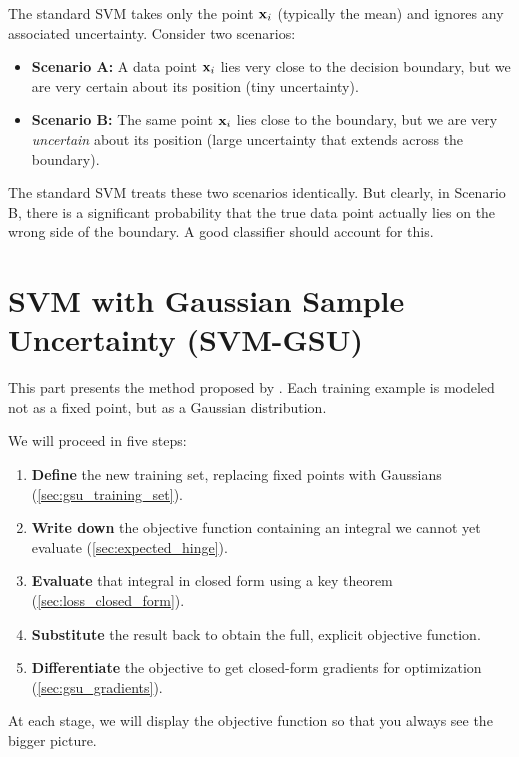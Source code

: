 \documentclass[11pt, letterpaper]{article}
\begin{document}
The standard SVM takes only the point $\vb{x}_i$ (typically the mean) and ignores any associated uncertainty. Consider two scenarios:
\begin{itemize}[leftmargin=2em]
    \item \textbf{Scenario A:} A data point $\vb{x}_i$ lies very close to the decision boundary, but we are very certain about its position (tiny uncertainty).
    \item \textbf{Scenario B:} The same point $\vb{x}_i$ lies close to the boundary, but we are very \emph{uncertain} about its position (large uncertainty that extends across the boundary).
\end{itemize}
The standard SVM treats these two scenarios identically. But clearly, in Scenario B, there is a significant probability that the true data point actually lies on the wrong side of the boundary. A good classifier should account for this.


\part{SVM with Gaussian Sample Uncertainty (SVM-GSU)}

This part presents the method proposed by \textcite{tzelepis2017linear}. Each training example is modeled not as a fixed point, but as a Gaussian distribution.

\medskip
\begin{statusbox}
We will proceed in five steps:
\begin{enumerate}[leftmargin=1.5em, topsep=2pt, itemsep=1pt]
    \item \textbf{Define} the new training set, replacing fixed points with Gaussians (\cref{sec:gsu_training_set}).
    \item \textbf{Write down} the objective function containing an integral we cannot yet evaluate (\cref{sec:expected_hinge}).
    \item \textbf{Evaluate} that integral in closed form using a key theorem (\cref{sec:loss_closed_form}).
    \item \textbf{Substitute} the result back to obtain the full, explicit objective function.
    \item \textbf{Differentiate} the objective to get closed-form gradients for optimization (\cref{sec:gsu_gradients}).
\end{enumerate}
At each stage, we will display the objective function so that you always see the bigger picture.
\end{statusbox}
\end{document}
